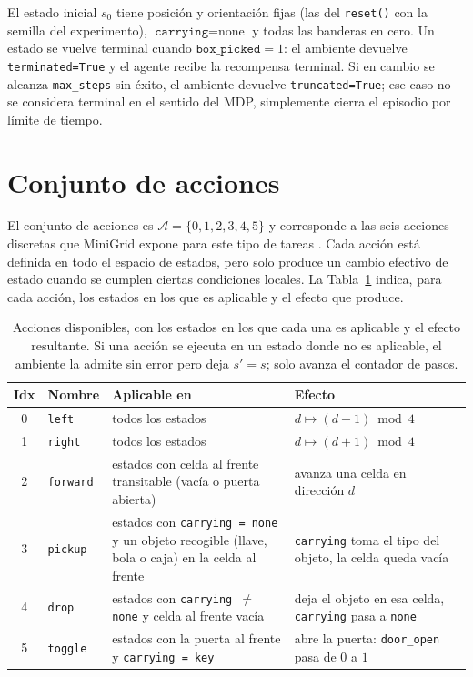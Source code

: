 \documentclass[11pt,a4paper]{article}
\begin{document}
El estado inicial \(s_0\) tiene posición y orientación fijas (las del
\texttt{reset()} con la semilla del experimento), \(\texttt{carrying} =
\text{none}\) y todas las banderas en cero. Un estado se vuelve terminal
cuando \(\texttt{box\_picked} = 1\): el ambiente devuelve
\texttt{terminated=True} y el agente recibe la recompensa terminal. Si en
cambio se alcanza \texttt{max\_steps} sin éxito, el ambiente devuelve
\texttt{truncated=True}; ese caso no se considera terminal en el sentido
del MDP, simplemente cierra el episodio por límite de tiempo.

\section{Conjunto de acciones}
\label{sec:acciones}

El conjunto de acciones es \(\mathcal{A} = \{0,1,2,3,4,5\}\) y corresponde a
las seis acciones discretas que MiniGrid expone para este tipo de tareas
\cite{minigrid}. Cada acción está definida en todo el espacio de estados,
pero solo produce un cambio efectivo de estado cuando se cumplen ciertas
condiciones locales. La Tabla~\ref{tab:actions} indica, para cada acción,
los estados en los que es aplicable y el efecto que produce.

\begin{table}[h]
  \centering
  \small
  \setlength{\extrarowheight}{3pt}
  \begin{tabularx}{\linewidth}{c l X X}
    \toprule
    \textbf{Idx} & \textbf{Nombre} & \textbf{Aplicable en} & \textbf{Efecto} \\
    \midrule
    0 & \texttt{left}    & todos los estados & \(d \mapsto (d-1) \bmod 4\) \\
    1 & \texttt{right}   & todos los estados & \(d \mapsto (d+1) \bmod 4\) \\
    2 & \texttt{forward} & estados con celda al frente transitable (vacía o puerta abierta) & avanza una celda en dirección \(d\) \\
    3 & \texttt{pickup}  & estados con \texttt{carrying = none} y un objeto recogible (llave, bola o caja) en la celda al frente & \texttt{carrying} toma el tipo del objeto, la celda queda vacía \\
    4 & \texttt{drop}    & estados con \texttt{carrying \(\neq\) none} y celda al frente vacía & deja el objeto en esa celda, \texttt{carrying} pasa a \texttt{none} \\
    5 & \texttt{toggle}  & estados con la puerta al frente y \texttt{carrying = key} & abre la puerta: \texttt{door\_open} pasa de \(0\) a \(1\) \\
    \bottomrule
  \end{tabularx}
  \caption{Acciones disponibles, con los estados en los que cada una es
  aplicable y el efecto resultante. Si una acción se ejecuta en un estado
  donde no es aplicable, el ambiente la admite sin error pero deja
  \(s' = s\); solo avanza el contador de pasos.}
  \label{tab:actions}
\end{table}
\end{document}
